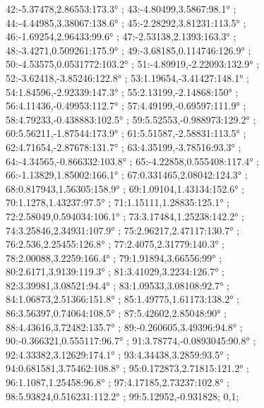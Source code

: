 \documentclass[a4paper,10pt,ngerman]{scrartcl}
\begin{document}
\begin{algorithm}[H]
\begin{figure}[!h]
{                42:-5.37478,2.86553:173.3° ;
                43:-4.80499,3.5867:98.1° ;
                44:-4.44985,3.38067:138.6° ;
                45:-2.28292,3.81231:113.5° ;
                46:-1.69254,2.96433:99.6° ;
                47:-2.53138,2.1393:163.3° ;
                48:-3.4271,0.509261:175.9° ;
                49:-3.68185,0.114746:126.9° ;
                50:-4.53575,0.0531772:103.2° ;
                51:-4.89919,-2.22093:132.9° ;
                52:-3.62418,-3.85246:122.8° ;
                53:1.19654,-3.41427:148.1° ;
                54:1.84596,-2.92339:147.3° ;
                55:2.13199,-2.14868:150° ;
                56:4.11436,-0.49953:112.7° ;
                57:4.49199,-0.69597:111.9° ;
                58:4.79233,-0.438883:102.5° ;
                59:5.52553,-0.988973:129.2° ;
                60:5.56211,-1.87544:173.9° ;
                61:5.51587,-2.58831:113.5° ;
                62:4.71654,-2.87678:131.7° ;
                63:4.35199,-3.78516:93.3° ;
                64:-4.34565,-0.866332:103.8° ;
                65:-4.22858,0.555408:117.4° ;
                66:-1.13829,1.85002:166.1° ;
                67:0.331465,2.08042:124.3° ;
                68:0.817943,1.56305:158.9° ;
                69:1.09104,1.43134:152.6° ;
                70:1.1278,1.43237:97.5° ;
                71:1.15111,1.28835:125.1° ;
                72:2.58049,0.594034:106.1° ;
                73:3.17484,1.25238:142.2° ;
                74:3.25846,2.34931:107.9° ;
                75:2.96217,2.47117:130.7° ;
                76:2.536,2.25455:126.8° ;
                77:2.4075,2.31779:140.3° ;
                78:2.00088,3.2259:166.4° ;
                79:1.91894,3.66556:99° ;
                80:2.6171,3.9139:119.3° ;
                81:3.41029,3.2234:126.7° ;
                82:3.39981,3.08521:94.4° ;
                83:1.09533,3.08108:92.7° ;
                84:1.06873,2.51366:151.8° ;
                85:1.49775,1.61173:138.2° ;
                86:3.56397,0.74064:108.5° ;
                87:5.42602,2.85048:90° ;
                88:4.43616,3.72482:135.7° ;
                89:-0.260605,3.49396:94.8° ;
                90:-0.366321,0.555117:96.7° ;
                91:3.78774,-0.0893045:90.8° ;
                92:4.33382,3.12629:174.1° ;
                93:4.34438,3.2859:93.5° ;
                94:0.681581,3.75462:108.8° ;
                95:0.172873,2.71815:121.2° ;
                96:1.1087,1.25458:96.8° ;
                97:4.17185,2.73237:102.8° ;
                98:5.93824,0.516231:112.2° ;
                99:5.12952,-0.931828;
            }{
                0,1;
}
\end{figure}
\end{algorithm}
\end{document}
